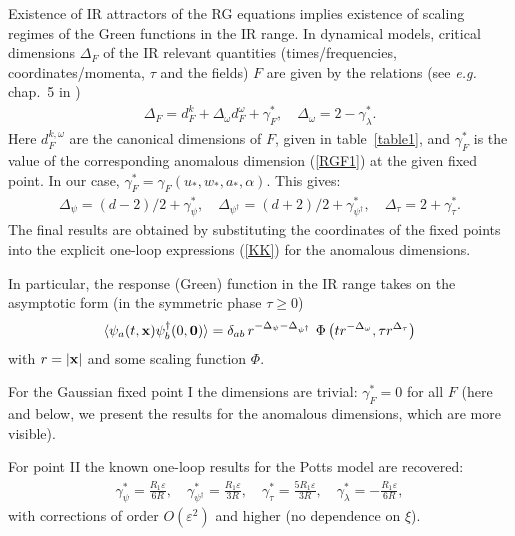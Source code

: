 \documentclass[12pt]{iopart}
\begin{document}
Existence of IR attractors of the RG equations implies existence of
scaling regimes of the Green functions in the IR range.
In dynamical models, critical dimensions $\Delta_{F}$ of the IR relevant
quantities (times/frequencies, coordinates/momenta, $\tau$ and the fields)
$F$ are given by the relations (see {\it e.g.} chap.~5 in \cite{Book3})
\begin{eqnarray}
\Delta_{F} = d^{k}_{F}+ \Delta_{\omega} d^{\omega}_{F} + \gamma_{F}^{*},
\quad  \Delta_{\omega}=2 -\gamma_{\lambda}^{*}.
\label{dim}
\end{eqnarray}
Here $d^{k,\omega}_{F}$ are the canonical dimensions of $F$, given in
table~\ref{table1}, and $\gamma_{F}^{*}$ is the value of the
corresponding anomalous dimension (\ref{RGF1}) at the given fixed point.
In our case, $\gamma_{F}^{*} = \gamma_{F} (u_{*},w_{*},a_{*},\alpha)$.
This gives:
\begin{eqnarray}
\Delta_{\psi}= (d-2)/2+\gamma^{*}_{\psi}, \quad
\Delta_{\psi^{\dag}}= (d+2)/2+\gamma^{*}_{\psi^{\dag}}, \quad
\Delta_{\tau} =2+\gamma^{*}_{\tau}.
\label{dim2}
\end{eqnarray}
The final results are obtained by substituting the coordinates of the
fixed points into the explicit one-loop expressions (\ref{KK}) for the
anomalous dimensions.

In particular, the response (Green) function in the IR range takes on the
asymptotic form (in the symmetric phase $\tau\ge0$)
\begin{eqnarray}
\langle \psi_{a} (t,{\bf x}) \psi^{\dag}_{b} (0,{\bf 0}) \rangle =
\delta_{ab}\, r^{-\Delta_{\psi}-\Delta_{\psi^{\dag}}} \,\, \Phi\left(
t r^{-\Delta_{\omega}}, \tau r^{\Delta_{\tau}} \right)
\label{Green}
\end{eqnarray}
with $r=|{\bf x}|$ and some scaling function $\Phi$.

For the Gaussian fixed point I the dimensions are trivial:
$\gamma^{*}_{F}=0$ for all $F$ (here and below, we present the results for
the anomalous dimensions, which are more visible).

For point II the known one-loop results for the Potts model are recovered:
\begin{eqnarray}
\gamma_{\psi}^{*} = \frac{R_{1}\varepsilon}{6R},
\quad \gamma_{\psi^{\dag}}^{*} =  \frac{R_{1}\varepsilon}{3R}, \quad
\gamma_{\tau}^{*} = \frac{5R_{1}\varepsilon}{3R}, \quad
\gamma_{\lambda}^{*} = - \frac{R_{1}\varepsilon}{6R},
\label{dimPotts}
\end{eqnarray}
with corrections of order $O(\varepsilon^{2})$ and higher (no dependence
on $\xi$).
\end{document}
